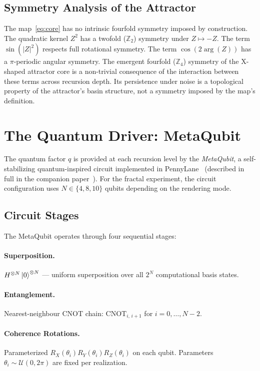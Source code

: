 \documentclass[twocolumn,amsmath,amssymb,prl]{revtex4-2}
\begin{document}
\subsection{Symmetry Analysis of the Attractor}

The map~\eqref{eq:core} has no intrinsic fourfold symmetry imposed by
construction.  The quadratic kernel $Z^2$ has a twofold ($\mathbb{Z}_2$)
symmetry under $Z \mapsto -Z$.  The term $\sin(|Z|^2)$ respects full
rotational symmetry.  The term $\cos(2\arg(Z))$ has a $\pi$-periodic angular
symmetry.  The emergent fourfold ($\mathbb{Z}_4$) symmetry of the X-shaped
attractor core is a non-trivial consequence of the interaction between these
terms across recursion depth.  Its persistence under noise is a topological
property of the attractor's basin structure, not a symmetry imposed by the
map's definition.

\section{The Quantum Driver: MetaQubit}
\label{sec:metaqubit}

The quantum factor $q$ is provided at each recursion level by the
\emph{MetaQubit}, a self-stabilizing quantum-inspired circuit implemented
in PennyLane~\cite{Bergholm2018} (described in full in the companion
paper~\cite{DemopoulosMetaQubit}).  For the fractal experiment, the
circuit configuration uses $N \in \{4, 8, 10\}$ qubits depending on
the rendering mode.

\subsection{Circuit Stages}

The MetaQubit operates through four sequential stages:

\paragraph{Superposition.}
$H^{\otimes N}\ket{0}^{\otimes N}$ — uniform superposition over all
$2^N$ computational basis states.

\paragraph{Entanglement.}
Nearest-neighbour CNOT chain: $\text{CNOT}_{i,\, i+1}$ for
$i = 0, \ldots, N-2$.

\paragraph{Coherence Rotations.}
Parameterized $R_X(\theta_i)R_Y(\theta_i)R_Z(\theta_i)$ on each qubit.
Parameters $\theta_i \sim \mathcal{U}(0, 2\pi)$ are fixed per realization.
\end{document}
